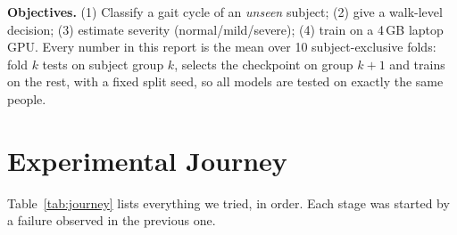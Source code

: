 \documentclass[conference]{IEEEtran}
\begin{document}
\textbf{Objectives.} (1) Classify a gait cycle of an \emph{unseen} subject;
(2) give a walk-level decision; (3) estimate severity (normal/mild/severe);
(4) train on a 4\,GB laptop GPU. Every number in this report is the mean over
10 subject-exclusive folds: fold $k$ tests on subject group $k$, selects the
checkpoint on group $k{+}1$ and trains on the rest, with a fixed split seed, so
all models are tested on exactly the same people.

\section{Experimental Journey}
Table~\ref{tab:journey} lists everything we tried, in order. Each stage was
started by a failure observed in the previous one.
\end{document}
